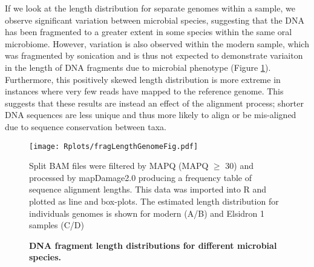\documentclass[12pt, a4paper]{article}
\begin{document}
If we look at the length distribution for separate genomes within a sample, we observe significant variation between microbial species, suggesting that the DNA has been fragmented to a greater extent in some species within the same oral microbiome. 
However, variation is also observed within the modern sample, which was fragmented by sonication and is thus not expected to demonstrate variaiton in the length of DNA fragments due to microbial phenotype (Figure \ref{fig:lengthDistCompare}). 
Furthermore, this positively skewed length distribution is more extreme in instances where very few reads have mapped to the reference genome. 
This suggests that these results are instead an effect of the alignment process; shorter DNA sequences are less unique and thus more likely to align or be mis-aligned due to sequence conservation between taxa.\\

\begin{figure}[ht!]
	\setlength\abovecaptionskip{10pt}
	\begin{center}
	\texttt{[image: Rplots/fragLengthGenomeFig.pdf]}
	\end{center}
	\small\caption[DNA fragment length distributions for different microbial species]{\textbf{DNA fragment length distributions for different microbial species.}}\small{Split BAM files were filtered by MAPQ (MAPQ $\geq$ 30) and processed by mapDamage2.0 producing a frequency table of sequence alignment lengths. This data was imported into R and plotted as line and box-plots. The estimated length distribution for individuals genomes is shown for modern (A/B) and Elsidron 1 samples (C/D) }\label{fig:lengthDistCompare}
\end{figure} 
\end{document}
